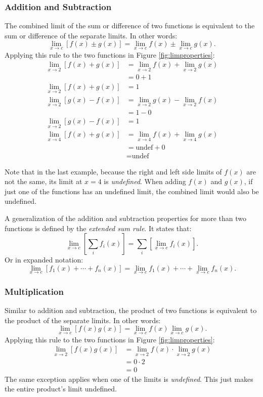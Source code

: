 \documentclass[12pt]{article}
\begin{document}
\subsubsection{Addition and Subtraction}
The combined limit of the sum or difference of two functions is equivalent to the sum or difference of the separate limits. In other words:
\[ \lim_{x \to c} \left[ f(x) \pm g(x) \right] = \lim_{x \to c} f(x) \pm \lim_{x \to c} g(x). \]
Applying this rule to the two functions in Figure \ref{fig:limproperties}:
\begin{align*}
	\lim_{x \to 2} \left[ f(x) + g(x) \right] &= \lim_{x \to 2} f(x) + \lim_{x \to 2} g(x) \\
	&= 0 + 1 \\
	\lim_{x \to 2} \left[ f(x) + g(x) \right] &= 1 \\[10pt]
	\lim_{x \to 2} \left[ g(x) - f(x) \right] &= \lim_{x \to 2} g(x) - \lim_{x \to 2} f(x) \\
	&= 1 - 0 \\
	\lim_{x \to 2} \left[ g(x) - f(x) \right] &= 1 \\[10pt]
	\lim_{x \to 4} \left[ f(x) + g(x) \right] &= \lim_{x \to 4} f(x) + \lim_{x \to 4} g(x) \\
	&= \text{undef} + 0 \\
	&= \text{undef}
\end{align*}

Note that in the last example, because the right and left side limits of $f(x)$ are not the same, its limit at $x = 4$ is \textit{undefined}. When adding $f(x)$ and $g(x)$, if just one of the functions has an undefined limit, the combined limit would also be undefined.

A generalization of the addition and subtraction properties for more than two functions is defined by the \textit{extended sum rule}. It states that:
\[ \lim_{x \to c} \left[ \sum_i f_i(x) \right] = \sum_i \left[ \lim_{x \to c} f_i(x) \right]. \]
Or in expanded notation:
\[ \lim_{x \to c} \left[ f_1(x) + \cdots + f_n(x) \right] = \lim_{x \to c} f_1(x) + \cdots + \lim_{x \to c} f_n(x). \]

\subsubsection{Multiplication}
Similar to addition and subtraction, the product of two functions is equivalent to the product of the separate limits. In other words:
\[ \lim_{x \to c} \left[ f(x) g(x) \right] = \lim_{x \to c} f(x) \lim_{x \to c} g(x). \]
Applying this rule to the two functions in Figure \ref{fig:limproperties}:
\begin{align*}
	\lim_{x \to 2} \left[ f(x) g(x) \right]
	&= \lim_{x \to 2} f(x) \cdot \lim_{x \to 2} g(x) \\
	&= 0 \cdot 2 \\
	&= 0
\end{align*}
The same exception applies when one of the limits is \textit{undefined}. This just makes the entire product's limit undefined.
\end{document}
